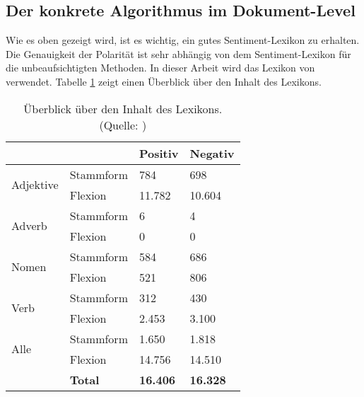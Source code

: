 \subsection{Der konkrete Algorithmus im Dokument-Level}  \label{algorithmus}
Wie es oben gezeigt wird, ist es wichtig, ein gutes Sentiment-Lexikon zu erhalten. Die Genauigkeit der Polarität ist sehr abhängig von dem Sentiment-Lexikon für die unbeaufsichtigten Methoden. In dieser Arbeit wird das Lexikon von \citet{Remus2010} verwendet. Tabelle \ref{tab:LexikonInhalt} zeigt einen Überblick über den Inhalt des Lexikons.
\begin{table}[htb]
\centering
\begin{tabular}{|l|l|l|l|}
\hline
                                                 &                & Positiv         & Negativ         \\ \hline
\multicolumn{1}{|c|}{\multirow{2}{*}{Adjektive}} & Stammform      & 784             & 698             \\ \cline{2-4} 
\multicolumn{1}{|c|}{}                           & Flexion        & 11.782          & 10.604          \\ \hline
\multirow{2}{*}{Adverb}                          & Stammform      & 6               & 4               \\ \cline{2-4} 
                                                 & Flexion        & 0               & 0               \\ \hline
\multirow{2}{*}{Nomen}                           & Stammform      & 584             & 686             \\ \cline{2-4} 
                                                 & Flexion        & 521             & 806             \\ \hline
\multirow{2}{*}{Verb}                            & Stammform      & 312             & 430             \\ \cline{2-4} 
                                                 & Flexion        & 2.453           & 3.100           \\ \hline
\multirow{2}{*}{Alle}                            & Stammform      & 1.650           & 1.818           \\ \cline{2-4} 
                                                 & Flexion        & 14.756          & 14.510          \\ \hline
\textbf{}                                        & \textbf{Total} & \textbf{16.406} & \textbf{16.328} \\ \hline
\end{tabular}
\caption[Überblick über den Inhalt des Lexikons]{Überblick über den Inhalt des Lexikons. (Quelle: \citealp{Remus2010})}
\label{tab:LexikonInhalt}
\end{table}

